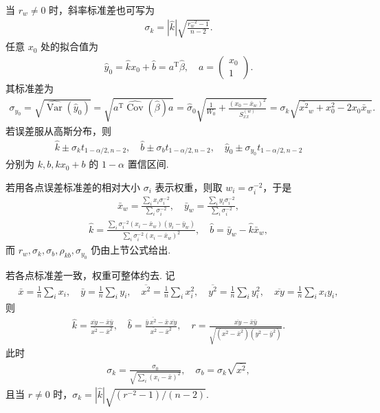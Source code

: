 当 \(r_w\neq0\) 时，斜率标准差也可写为
\begin{align*}
	\sigma_k=|\hat{k}|\sqrt{\frac{r_w^{-2}-1}{n-2}}.
\end{align*}
任意 \(x_0\) 处的拟合值为
\begin{align*}
	\hat{y}_0=\hat{k}x_0+\hat{b}=a^\mathrm{T}\hat{\beta},
	\quad a=\begin{pmatrix}x_0\\1\end{pmatrix}.
\end{align*}
其标准差为
\begin{align*}
	\sigma_{y_0}=\sqrt{\widehat{\operatorname{Var}}(\hat{y}_0)}
	=\sqrt{a^\mathrm{T}\widehat{\operatorname{Cov}}(\hat{\beta})a}
	=\hat{\sigma}_0\sqrt{\frac{1}{W_0}+\frac{(x_0-\bar{x}_w)^2}{S_{xx}^{(w)}}}
	=\sigma_k\sqrt{\overline{x^2}_w+x_0^2-2x_0\bar{x}_w}.
\end{align*}
若误差服从高斯分布，则
\begin{align*}
	\hat{k}\pm\sigma_k t_{1-\alpha/2,n-2},
	\quad \hat{b}\pm\sigma_b t_{1-\alpha/2,n-2},
	\quad \hat{y}_0\pm\sigma_{y_0}t_{1-\alpha/2,n-2}
\end{align*}
分别为 \(k,b,kx_0+b\) 的 \(1-\alpha\) 置信区间.

\begin{note}

若用各点误差标准差的相对大小 \(\sigma_i\) 表示权重，则取 \(w_i=\sigma_i^{-2}\)，于是
\begin{align*}
	\bar{x}_w=\frac{\sum_ix_i\sigma_i^{-2}}{\sum_i\sigma_i^{-2}},
	\quad \bar{y}_w=\frac{\sum_iy_i\sigma_i^{-2}}{\sum_i\sigma_i^{-2}},
\end{align*}
\begin{align*}
	\hat{k}=\frac{\sum_i\sigma_i^{-2}(x_i-\bar{x}_w)(y_i-\bar{y}_w)}
	{\sum_i\sigma_i^{-2}(x_i-\bar{x}_w)^2},
	\quad \hat{b}=\bar{y}_w-\hat{k}\bar{x}_w,
\end{align*}
而 \(r_w,\sigma_k,\sigma_b,\rho_{kb},\sigma_{y_0}\) 仍由上节公式给出.

若各点标准差一致，权重可整体约去. 记
\begin{align*}
	\bar{x}=\frac{1}{n}\sum_ix_i,
	\quad \bar{y}=\frac{1}{n}\sum_iy_i,
	\quad \overline{x^2}=\frac{1}{n}\sum_ix_i^2,
	\quad \overline{y^2}=\frac{1}{n}\sum_iy_i^2,
	\quad \overline{xy}=\frac{1}{n}\sum_ix_iy_i,
\end{align*}
则
\begin{align*}
	\hat{k}=\frac{\overline{xy}-\bar{x}\bar{y}}{\overline{x^2}-\bar{x}^2},
	\quad \hat{b}=\frac{\bar{y}\,\overline{x^2}-\bar{x}\,\overline{xy}}{\overline{x^2}-\bar{x}^2},\quad
	r=\frac{\overline{xy}-\bar{x}\bar{y}}
	{\sqrt{(\overline{x^2}-\bar{x}^2)(\overline{y^2}-\bar{y}^2)}}.
\end{align*}
此时
\begin{align*}
	\sigma_k=\frac{\hat{\sigma}_0}{\sqrt{\sum_i(x_i-\bar{x})^2}},
	\quad \sigma_b=\sigma_k\sqrt{\overline{x^2}},
\end{align*}
且当 \(r\neq0\) 时，\(\sigma_k=|\hat{k}|\sqrt{(r^{-2}-1)/(n-2)}\).

\end{note}
